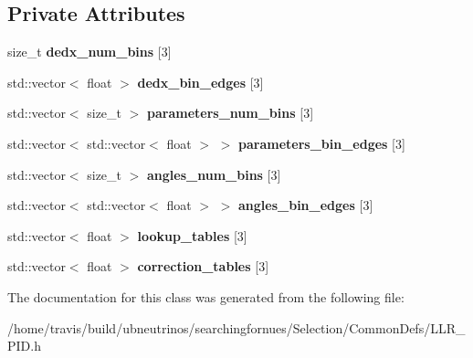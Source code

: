 \subsection*{Private Attributes}
\begin{DoxyCompactItemize}
\item 
size\+\_\+t {\bfseries dedx\+\_\+num\+\_\+bins} \mbox{[}3\mbox{]}\hypertarget{classsearchingfornues_1_1LLRPID_aa7d6cc52226bd9b52c83605c28bff6ea}{}\label{classsearchingfornues_1_1LLRPID_aa7d6cc52226bd9b52c83605c28bff6ea}

\item 
std\+::vector$<$ float $>$ {\bfseries dedx\+\_\+bin\+\_\+edges} \mbox{[}3\mbox{]}\hypertarget{classsearchingfornues_1_1LLRPID_a7737c601081b0794bf10639b073736ea}{}\label{classsearchingfornues_1_1LLRPID_a7737c601081b0794bf10639b073736ea}

\item 
std\+::vector$<$ size\+\_\+t $>$ {\bfseries parameters\+\_\+num\+\_\+bins} \mbox{[}3\mbox{]}\hypertarget{classsearchingfornues_1_1LLRPID_a16cf6fb36071fd876bb6d0fade4141f9}{}\label{classsearchingfornues_1_1LLRPID_a16cf6fb36071fd876bb6d0fade4141f9}

\item 
std\+::vector$<$ std\+::vector$<$ float $>$ $>$ {\bfseries parameters\+\_\+bin\+\_\+edges} \mbox{[}3\mbox{]}\hypertarget{classsearchingfornues_1_1LLRPID_a5fbeb32743ce2b01d944ceaf19086bb5}{}\label{classsearchingfornues_1_1LLRPID_a5fbeb32743ce2b01d944ceaf19086bb5}

\item 
std\+::vector$<$ size\+\_\+t $>$ {\bfseries angles\+\_\+num\+\_\+bins} \mbox{[}3\mbox{]}\hypertarget{classsearchingfornues_1_1LLRPID_aecb908df1325d9c73c05d6ad6877883b}{}\label{classsearchingfornues_1_1LLRPID_aecb908df1325d9c73c05d6ad6877883b}

\item 
std\+::vector$<$ std\+::vector$<$ float $>$ $>$ {\bfseries angles\+\_\+bin\+\_\+edges} \mbox{[}3\mbox{]}\hypertarget{classsearchingfornues_1_1LLRPID_a146de7098062abefcaeee0c181f94c38}{}\label{classsearchingfornues_1_1LLRPID_a146de7098062abefcaeee0c181f94c38}

\item 
std\+::vector$<$ float $>$ {\bfseries lookup\+\_\+tables} \mbox{[}3\mbox{]}\hypertarget{classsearchingfornues_1_1LLRPID_a33cb1049caaa153b9bc181983e89d7ea}{}\label{classsearchingfornues_1_1LLRPID_a33cb1049caaa153b9bc181983e89d7ea}

\item 
std\+::vector$<$ float $>$ {\bfseries correction\+\_\+tables} \mbox{[}3\mbox{]}\hypertarget{classsearchingfornues_1_1LLRPID_a2f1bfbcd22dfd1b47d2bde8407eebc90}{}\label{classsearchingfornues_1_1LLRPID_a2f1bfbcd22dfd1b47d2bde8407eebc90}

\end{DoxyCompactItemize}


The documentation for this class was generated from the following file\+:\begin{DoxyCompactItemize}
\item 
/home/travis/build/ubneutrinos/searchingfornues/\+Selection/\+Common\+Defs/L\+L\+R\+\_\+\+P\+I\+D.\+h\end{DoxyCompactItemize}
